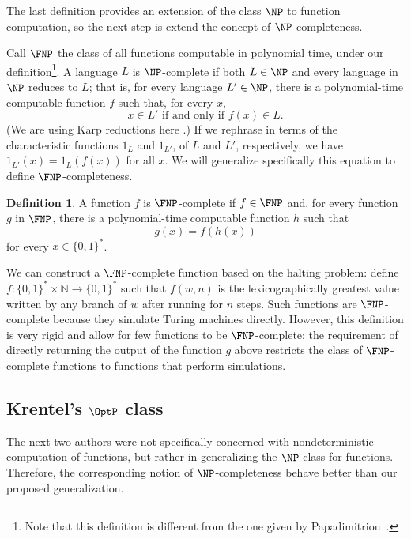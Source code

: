 \documentclass[12pt]{article}
\theoremstyle{definition}
\newtheorem{definition}{Definition}
\begin{document}
The last definition provides an extension of the class $\NP$ to function computation,
so the next step is extend the concept of $\NP$-completeness.

Call $\FNP$ the class of all functions computable in polynomial time,
under our definition\footnote{
    Note that this definition
    is different from the one given by Papadimitriou~\cite[p~229]{Papadimitriou1994}.
}.
A language $L$ is $\NP$-complete if both $L \in \NP$
and every language in $\NP$ reduces to $L$;
that is, for every language $L' \in \NP$,
there is a polynomial-time computable function $f$
such that, for every $x$,
\begin{equation*}
    x \in L' \text{ if and only if } f(x) \in L.
\end{equation*}
(We are using Karp reductions here \cite[p.~42]{AroraBarak2009}.)
If we rephrase in terms of the characteristic functions $1_L$ and $1_{L'}$,
of $L$ and $L'$, respectively,
we have $1_{L'}(x) = 1_L(f(x))$ for all $x$.
We will generalize specifically this equation to define $\FNP$-completeness.

\vspace{6pt}
\begin{definition}
    A function $f$ is $\FNP$-complete if $f \in \FNP$ and,
    for every function $g$ in $\FNP$,
    there is a polynomial-time computable function $h$ such that
    \begin{equation*}
        g(x) = f(h(x))
    \end{equation*}
    for every $x \in \{0, 1\}^*$.
\end{definition}

We can construct a $\FNP$-complete function based on the halting problem:
define $f : \{0, 1\}^* \times \mathbb N \to \{0, 1\}^*$
such that $f(w, n)$ is the lexicographically greatest value written by any branch of $w$
after running for $n$ steps.
Such functions are $\FNP$-complete
because they simulate Turing machines directly.
However, this definition is very rigid
and allow for few functions to be $\FNP$-complete;
the requirement of directly returning the output of the function $g$ above
restricts the class of $\FNP$-complete functions
to functions that perform simulations.

\subsection{Krentel's $\OptP$ class}
\label{sec:krentel}

The next two authors were not specifically concerned
with nondeterministic computation of functions,
but rather in generalizing the $\NP$ class for functions.
Therefore, the corresponding notion of $\NP$-completeness
behave better than our proposed generalization.
\end{document}
